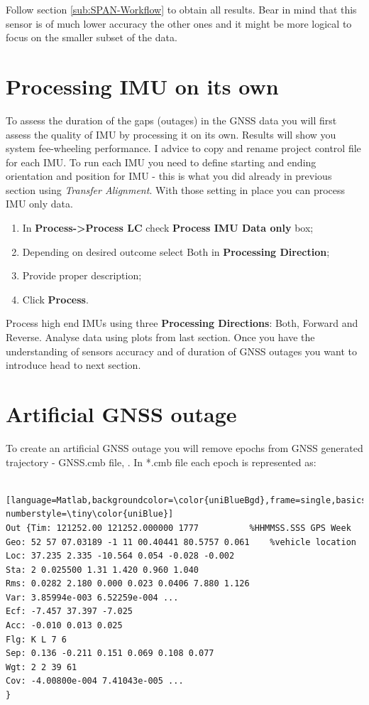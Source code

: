 \documentclass[11pt,fleqn]{book} %
\begin{document}
Follow section \ref{sub:SPAN-Workflow} to obtain all results. Bear in mind that this sensor is of much lower accuracy the other ones and it might be more logical to focus on the smaller subset of the data.

\chapter{Processing IMU on its own}\label{Processing-IMU-on-its-own}

To assess the duration of the gaps (outages) in the GNSS data you will first assess the quality of IMU by processing it on its own. Results will show you system fee-wheeling performance. I advice to copy and rename project control file for each IMU. To run each IMU you need to define starting and ending orientation and position for IMU - this is what you did already in previous section using \emph{Transfer Alignment}. With those setting in place you can process IMU only data. 

\begin{enumerate}
	\item In \textbf{Process->Process LC} check \textbf{Process IMU Data only} box;
	\item Depending on desired outcome select Both in \textbf{Processing Direction};
	\item Provide proper description;
	\item Click \textbf{Process}.
\end{enumerate}

\vspace{2cm}
Process high end IMUs using three \textbf{Processing Directions}: Both, Forward and Reverse. Analyse data using plots from last section. Once you have the understanding of sensors accuracy and of duration of GNSS outages you want to introduce head to next section.


\chapter{Artificial GNSS outage\label{sec:SIMUlating-GNSS-outage}}

To create an artificial GNSS outage you will remove epochs from GNSS generated trajectory - GNSS.cmb file, . In {*}.cmb file each epoch is represented as:
\bigskip
\begin{lstlisting} [language=Matlab,backgroundcolor=\color{uniBlueBgd},frame=single,basicstyle=\footnotesize,numbers=left,numbersep=5pt, numberstyle=\tiny\color{uniBlue}]
Out {Tim: 121252.00 121252.000000 1777 			%HHMMSS.SSS GPS Week
Geo: 52 57 07.03189 -1 11 00.40441 80.5757 0.061 	%vehicle location
Loc: 37.235 2.335 -10.564 0.054 -0.028 -0.002 	
Sta: 2 0.025500 1.31 1.420 0.960 1.040 	
Rms: 0.0282 2.180 0.000 0.023 0.0406 7.880 1.126 	
Var: 3.85994e-003 6.52259e-004 ...	
Ecf: -7.457 37.397 -7.025 	
Acc: -0.010 0.013 0.025 	
Flg: K L 7 6 	
Sep: 0.136 -0.211 0.151 0.069 0.108 0.077 	
Wgt: 2 2 39 61 	
Cov: -4.00800e-004 7.41043e-005 ...
}
\end{lstlisting}
\bigskip
\end{document}
